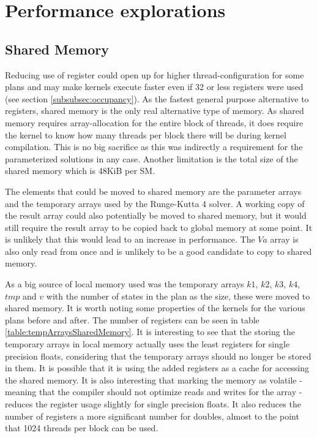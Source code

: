 \section{Performance explorations}
\subsection{Shared Memory}
Reducing use of register could open up for higher thread-configuration for some plans and may make kernels execute faster even if 32 or less registers were used (see section \ref{subsubsec:occupancy}).
As the fastest general purpose alternative to registers, shared memory is the only real alternative type of memory.
As shared memory requires array-allocation for the entire block of threads, it does require the kernel to know how many threads per block there will be during kernel compilation.
This is no big sacrifice as this was indirectly a requirement for the parameterized solutions in any case.
Another limitation is the total size of the shared memory which is 48KiB per SM.

The elements that could be moved to shared memory are the parameter arrays and the temporary arrays used by the Runge-Kutta 4 solver.
A working copy of the result array could also potentially be moved to shared memory, but it would still require the result array to be copied back to global memory at some point.
It is unlikely that this would lead to an increase in performance.
The $Va$ array is also only read from once and is unlikely to be a good candidate to copy to shared memory.

As a big source of local memory used was the temporary arrays $k1$, $k2$, $k3$, $k4$, $tmp$ and $v$ with the number of states in the plan as the size, these were moved to shared memory.
It is worth noting some properties of the kernels for the various plans before and after.
The number of registers can be seen in table \ref{table:tempArraysSharedMemory}.
It is interesting to see that the storing the temporary arrays in local memory actually uses the least registers for single precision floats, considering that the temporary arrays should no longer be stored in them.
It is possible that it is using the added registers as a cache for accessing the shared memory.
It is also interesting that marking the memory as volatile - meaning that the compiler should not optimize reads and writes for the array - reduces the register usage slightly for single precision floats.
It also reduces the number of registers a more significant number for doubles, almost to the point that 1024 threads per block can be used.


